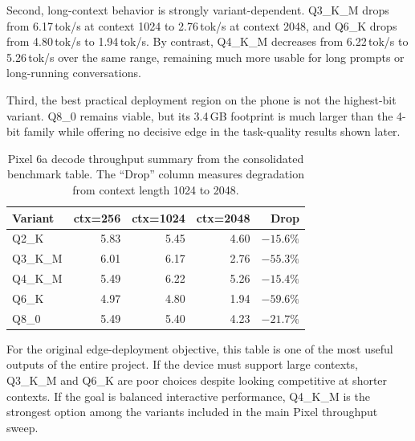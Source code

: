 \documentclass{article}
\begin{document}
Second, long-context behavior is strongly variant-dependent. Q3\_K\_M drops from 6.17\,tok/s at context 1024 to 2.76\,tok/s at context 2048, and Q6\_K drops from 4.80\,tok/s to 1.94\,tok/s. By contrast, Q4\_K\_M decreases from 6.22\,tok/s to 5.26\,tok/s over the same range, remaining much more usable for long prompts or long-running conversations.

Third, the best practical deployment region on the phone is not the highest-bit variant. Q8\_0 remains viable, but its 3.4\,GB footprint is much larger than the 4-bit family while offering no decisive edge in the task-quality results shown later.

\begin{table}[t]
\centering
\caption{Pixel 6a decode throughput summary from the consolidated benchmark table. The ``Drop'' column measures degradation from context length 1024 to 2048.}
\label{tab:pixel_tps}
\small
\begin{tabular}{lrrrr}
\toprule
\textbf{Variant} & \textbf{ctx=256} & \textbf{ctx=1024} & \textbf{ctx=2048} & \textbf{Drop} \\
\midrule
Q2\_K    & 5.83 & 5.45 & 4.60 & $-15.6\%$ \\
Q3\_K\_M & 6.01 & 6.17 & 2.76 & $-55.3\%$ \\
Q4\_K\_M & 5.49 & 6.22 & 5.26 & $-15.4\%$ \\
Q6\_K    & 4.97 & 4.80 & 1.94 & $-59.6\%$ \\
Q8\_0    & 5.49 & 5.40 & 4.23 & $-21.7\%$ \\
\bottomrule
\end{tabular}
\end{table}

For the original edge-deployment objective, this table is one of the most useful outputs of the entire project. If the device must support large contexts, Q3\_K\_M and Q6\_K are poor choices despite looking competitive at shorter contexts. If the goal is balanced interactive performance, Q4\_K\_M is the strongest option among the variants included in the main Pixel throughput sweep.
\end{document}
